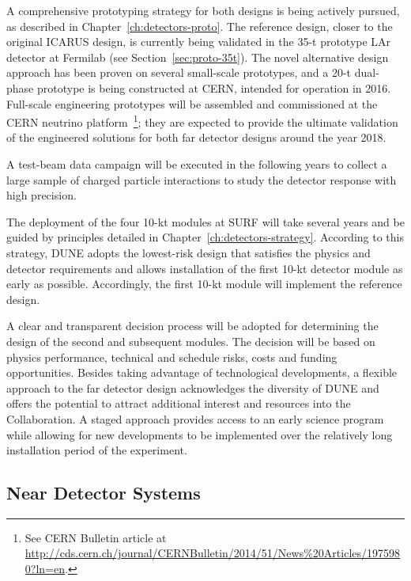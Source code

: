 A comprehensive prototyping strategy for both designs is being
actively pursued, as described in Chapter~\ref{ch:detectors-proto}.
The reference design, closer to the original ICARUS design, is
currently being validated in the 35-t prototype LAr detector at
Fermilab (see Section~\ref{sec:proto-35t}).  The novel alternative
design approach has been proven on several small-scale prototypes, and
a 20-t dual-phase prototype is being constructed at CERN, intended for
operation in 2016.  Full-scale engineering prototypes will be
assembled and commissioned at the CERN neutrino platform~\footnote{See
  CERN Bulletin article at
  \href{http://cds.cern.ch/journal/CERNBulletin/2014/51/News\%20Articles/1975980?ln=en}{http://cds.cern.ch/journal/CERNBulletin/2014/51/News\%20Articles/1975980?ln=en}.};
they are expected to provide the ultimate validation of the engineered
solutions for both far detector designs around the year 2018.

A test-beam data campaign will be executed in the following years to
collect a large sample of charged particle interactions to study the
detector response with high precision.

The deployment of the four 10-kt modules at SURF will take several
years and be guided by principles detailed in
Chapter~\ref{ch:detectors-strategy}. According to this strategy, DUNE
adopts the lowest-risk design that satisfies the physics and detector
requirements and allows installation of the first 10-kt detector
module as early as possible.  Accordingly, the first 10-kt module will
implement the reference design.  

A clear and transparent decision process will be adopted for
determining the design of the second and subsequent modules.  The
decision will be based on physics performance, technical and schedule
risks, costs and funding opportunities.  Besides taking advantage of
technological developments, a flexible approach to the far detector
design acknowledges the diversity of DUNE and offers the potential to
attract additional interest and resources into the Collaboration. A
staged approach provides access to an early science program while
allowing for new developments to be implemented over the relatively
long installation period of the experiment.

\subsection{Near Detector Systems}
\label{sec:intro-dune-near-det}


